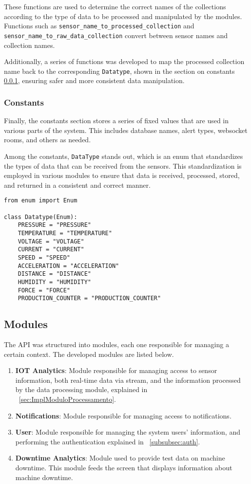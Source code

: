 These functions are used to determine the correct names of the collections according to the type of data to be processed and manipulated by the modules. Functions such as \texttt{sensor\_name\_to\_processed\_collection} and \texttt{sensor\_name\_to\_raw\_data\_collection} convert between sensor names and collection names.

Additionally, a series of functions was developed to map the processed collection name back to the corresponding \texttt{Datatype}, shown in the section on constants \ref{subsubsec:constantes}, ensuring safer and more consistent data manipulation.

\subsubsection{Constants}\label{subsubsec:constantes}
Finally, the constants section stores a series of fixed values that are used in various parts of the system. This includes database names, alert types, websocket rooms, and others as needed.

Among the constants, \texttt{DataType} stands out, which is an enum that standardizes the types of data that can be received from the sensors. This standardization is employed in various modules to ensure that data is received, processed, stored, and returned in a consistent and correct manner.

\begin{verbatim}
from enum import Enum

class Datatype(Enum):
    PRESSURE = "PRESSURE"
    TEMPERATURE = "TEMPERATURE"
    VOLTAGE = "VOLTAGE"
    CURRENT = "CURRENT"
    SPEED = "SPEED"
    ACCELERATION = "ACCELERATION"
    DISTANCE = "DISTANCE"
    HUMIDITY = "HUMIDITY"
    FORCE = "FORCE"
    PRODUCTION_COUNTER = "PRODUCTION_COUNTER"
\end{verbatim}

\subsection{Modules}\label{subsec:modules}
The \gls{API} was structured into modules, each one responsible for managing a certain context. The developed modules are listed below.

\begin{enumerate}
    \item \textbf{IOT Analytics}: Module responsible for managing access to sensor information, both real-time data via stream, and the information processed by the data processing module, explained in ~\ref{sec:ImplModuloProcessamento}.
    \item \textbf{Notifications}: Module responsible for managing access to notifications.
    \item \textbf{User}: Module responsible for managing the system users' information, and performing the authentication explained in ~\ref{subsubsec:auth}.
    \item \textbf{Downtime Analytics}: Module used to provide test data on machine downtime. This module feeds the screen that displays information about machine downtime.
\end{enumerate}


